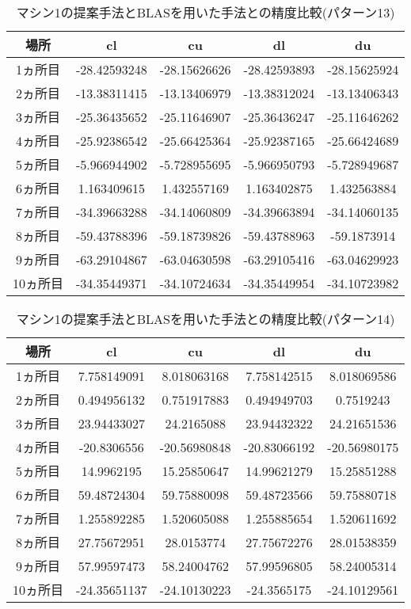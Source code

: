 \documentclass[11pt,a4paper]{jsreport}
\theoremstyle{definition}
\begin{document}
\begin{table}[H]
\centering
\begin{tabular}{|c|c|c|c|c|}
\hline
場所 & cl & cu & dl & du \\ \hline
1ヵ所目 & -28.42593248 & -28.15626626 & -28.42593893 & -28.15625924 \\ \hline
2ヵ所目 & -13.38311415 & -13.13406979 & -13.38312024 & -13.13406343 \\ \hline
3ヵ所目 & -25.36435652 & -25.11646907 & -25.36436247 & -25.11646262 \\ \hline
4ヵ所目 & -25.92386542 & -25.66425364 & -25.92387165 & -25.66424689 \\ \hline
5ヵ所目 & -5.966944902 & -5.728955695 & -5.966950793 & -5.728949687 \\ \hline
6ヵ所目 & 1.163409615 & 1.432557169 & 1.163402875 & 1.432563884 \\ \hline
7ヵ所目 & -34.39663288 & -34.14060809 & -34.39663894 & -34.14060135 \\ \hline
8ヵ所目 & -59.43788396 & -59.18739826 & -59.43788963 & -59.1873914 \\ \hline
9ヵ所目 & -63.29104867 & -63.04630598 & -63.29105416 & -63.04629923 \\ \hline
10ヵ所目 & -34.35449371 & -34.10724634 & -34.35449954 & -34.10723982 \\ \hline
\end{tabular}
\caption{マシン1の提案手法とBLASを用いた手法との精度比較(パターン13)}
\end{table}


\begin{table}[H]
\centering
\begin{tabular}{|c|c|c|c|c|}
\hline
場所 & cl & cu & dl & du \\ \hline
1ヵ所目 & 7.758149091 & 8.018063168 & 7.758142515 & 8.018069586 \\ \hline
2ヵ所目 & 0.494956132 & 0.751917883 & 0.494949703 & 0.7519243 \\ \hline
3ヵ所目 & 23.94433027 & 24.2165088 & 23.94432322 & 24.21651536 \\ \hline
4ヵ所目 & -20.8306556 & -20.56980848 & -20.83066192 & -20.56980175 \\ \hline
5ヵ所目 & 14.9962195 & 15.25850647 & 14.99621279 & 15.25851288 \\ \hline
6ヵ所目 & 59.48724304 & 59.75880098 & 59.48723566 & 59.75880718 \\ \hline
7ヵ所目 & 1.255892285 & 1.520605088 & 1.255885654 & 1.520611692 \\ \hline
8ヵ所目 & 27.75672951 & 28.0153774 & 27.75672276 & 28.01538359 \\ \hline
9ヵ所目 & 57.99597473 & 58.24004762 & 57.99596805 & 58.24005314 \\ \hline
10ヵ所目 & -24.35651137 & -24.10130223 & -24.3565175 & -24.10129561 \\ \hline
\end{tabular}
\caption{マシン1の提案手法とBLASを用いた手法との精度比較(パターン14)}
\end{table}
\end{document}
